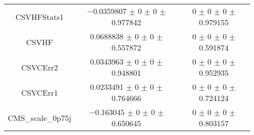 \begin{table}
\begin{tabular}{ccc}
CSVHFStats1 & \num{-0.0359807} $\pm$ \num{0} $\pm$ \num{0} $\pm$ \num{0.977842} & \num{0} $\pm$ \num{0} $\pm$ \num{0} $\pm$ \num{0.979155}\\
CSVHF & \num{0.0688838} $\pm$ \num{0} $\pm$ \num{0} $\pm$ \num{0.557872} & \num{0} $\pm$ \num{0} $\pm$ \num{0} $\pm$ \num{0.591874}\\
CSVCErr2 & \num{0.0343963} $\pm$ \num{0} $\pm$ \num{0} $\pm$ \num{0.948801} & \num{0} $\pm$ \num{0} $\pm$ \num{0} $\pm$ \num{0.952935}\\
CSVCErr1 & \num{0.0233491} $\pm$ \num{0} $\pm$ \num{0} $\pm$ \num{0.764666} & \num{0} $\pm$ \num{0} $\pm$ \num{0} $\pm$ \num{0.724124}\\
CMS\_scale\_0p75j & \num{-0.163045} $\pm$ \num{0} $\pm$ \num{0} $\pm$ \num{0.650645} & \num{0} $\pm$ \num{0} $\pm$ \num{0} $\pm$ \num{0.803157}\\
\bottomrule
\end{tabular}
\end{table}